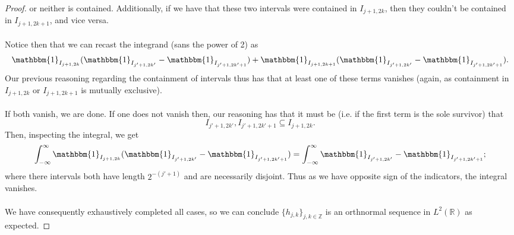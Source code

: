 \documentclass[12pt]{article}
\newenvironment{ex}[2][Exercise]{\begin{trivlist}
\item[\hskip \labelsep {\bfseries #1}\hskip \labelsep {\bfseries #2.}]}{\end{trivlist}}
\begin{document}
\begin{ex}{14}
\begin{enumerate}[label=(\alph*)]
\begin{proof}
            or neither is contained. Additionally, if we have that these two intervals were contained in $I_{j + 1, 2k}$, then they couldn't be contained in $I_{j + 1, 2k+1}$, and vice versa. \\ \\
            Notice then that we can recast the integrand (sans the power of 2) as 
            $$\mathbbm{1}_{I_{j + 1, 2k}} (\mathbbm{1}_{I_{j' + 1, 2k'}} - \mathbbm{1}_{I_{j' + 1, 2k' + 1}}) + \mathbbm{1}_{I_{j + 1, 2k + 1}}(\mathbbm{1}_{I_{j' + 1, 2k'}} - \mathbbm{1}_{I_{j' + 1, 2k' + 1}}).$$
            Our previous reasoning regarding the containment of intervals thus has that at least one of these terms vanishes (again, as containment in $I_{j + 1, 2k}$ or $I_{j + 1, 2k + 1}$ is mutually exclusive). \\ \\
            If both vanish, we are done. If one does not vanish then, our reasoning has that it must be (i.e. if the first term is the sole survivor) that 
            $$I_{j' + 1, 2k'}, I_{j' + 1, 2k' + 1} \subseteq I_{j + 1, 2k}.$$
            Then, inspecting the integral, we get 
            $$\int_{-\infty}^\infty \mathbbm{1}_{I_{j + 1, 2k}} (\mathbbm{1}_{I_{j' + 1, 2k'}} - \mathbbm{1}_{I_{j' + 1, 2k' + 1}}) = \int_{-\infty}^\infty \mathbbm{1}_{I_{j' + 1, 2k'}} - \mathbbm{1}_{I_{j' + 1, 2k' + 1}};$$
            where there intervals both have length $2^{-(j' + 1)}$ and are necessarily disjoint. Thus as we have opposite sign of the indicators, the integral vanishes. \\ \\
            We have consequently exhaustively completed all cases, so we can conclude $\{h_{j,k}\}_{j, k \in \mathbb{Z}}$ is an orthnormal sequence in $L^2(\mathbb{R})$ as expected.





\end{proof}
\end{enumerate}
\end{ex}
\end{document}
